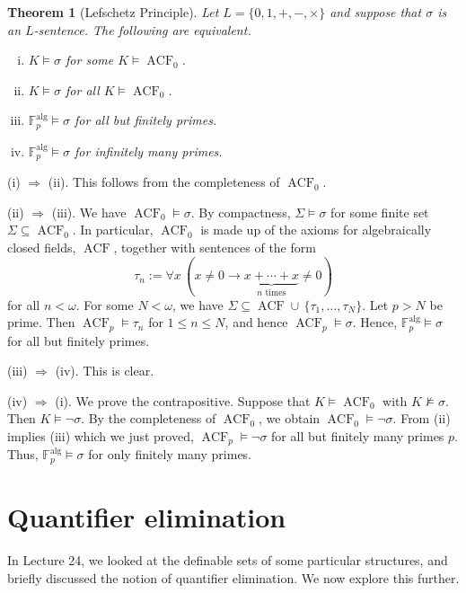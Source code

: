 \documentclass[10pt]{article}
\makeatletter
\newcommand{\F}{\mathbb{F}}
\DeclareMathOperator{\ACF}{ACF}
\DeclareMathOperator{\alg}{alg}
\theoremstyle{newstyle}
\newtheorem{thm}{Theorem}[section]
\newenvironment{pf}[1][\proofname]{\par
  \pushQED{\qed}%
  \normalfont \topsep0\p@\relax
  \trivlist
  \item[\hskip\labelsep\scshape
  #1\@addpunct{.}]\ignorespaces
}{%
  \popQED\endtrivlist\@endpefalse
}
\makeatother
\begin{document}
\begin{thm}[Lefschetz Principle] 
Let $L = \{0, 1, +, -, \times\}$ and suppose that $\sigma$ is an $L$-sentence. The following are 
equivalent.
\begin{enumerate}[(i)]
    \item $K \vDash \sigma$ for some $K \vDash \ACF_0$.
    \item $K \vDash \sigma$ for all $K \vDash \ACF_0$.
    \item $\F_p^{\alg} \vDash \sigma$ for all but finitely primes.
    \item $\F_p^{\alg} \vDash \sigma$ for infinitely many primes.
\end{enumerate}
\end{thm}
\begin{pf}
(i) $\Rightarrow$ (ii). This follows from the completeness of $\ACF_0$. 

(ii) $\Rightarrow$ (iii). We have $\ACF_0 \vDash \sigma$. By compactness, $\Sigma \vDash \sigma$ 
for some finite set $\Sigma \subseteq \ACF_0$. In particular, $\ACF_0$ is made up of the axioms 
for algebraically closed fields, $\ACF$, together with sentences of the form 
\[ \tau_n := \forall x \, (x \neq 0 \to \underbrace{x + \cdots + x}_{\text{$n$ times}} \neq 0) \] 
for all $n < \omega$. For some $N < \omega$, we have $\Sigma \subseteq 
\ACF \cup \, \{\tau_1, \dots, \tau_N\}$. Let $p > N$ be prime. Then $\ACF_p \vDash \tau_n$ for 
$1 \leq n \leq N$, and hence $\ACF_p \vDash \sigma$. Hence, $\F_p^{\alg} \vDash \sigma$ 
for all but finitely primes.

(iii) $\Rightarrow$ (iv). This is clear. 

(iv) $\Rightarrow$ (i). We prove the contrapositive. Suppose that $K \vDash \ACF_0$ with 
$K \nvDash \sigma$. Then $K \vDash \neg \sigma$. By the completeness of $\ACF_0$, 
we obtain $\ACF_0 \vDash \neg \sigma$. From (ii) implies (iii) which we just proved, 
$\ACF_p \vDash \neg \sigma$ for all but finitely many primes $p$. Thus, 
$\F_p^{\alg} \vDash \sigma$ for only finitely many primes.
\end{pf}

\newpage
\section{Quantifier elimination}

In Lecture 24, we looked at the definable sets of some particular structures, and briefly 
discussed the notion of quantifier elimination. We now explore this further. 
\end{document}
